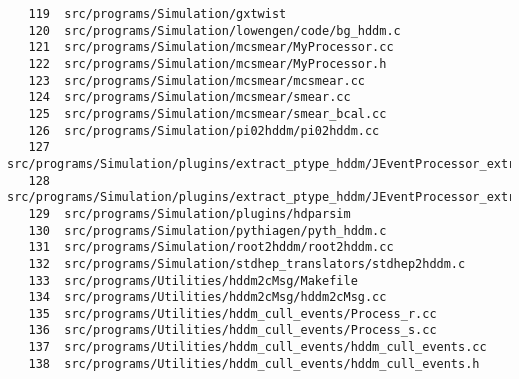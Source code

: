\small
\begin{verbatim}
   119  src/programs/Simulation/gxtwist
   120  src/programs/Simulation/lowengen/code/bg_hddm.c
   121  src/programs/Simulation/mcsmear/MyProcessor.cc
   122  src/programs/Simulation/mcsmear/MyProcessor.h
   123  src/programs/Simulation/mcsmear/mcsmear.cc
   124  src/programs/Simulation/mcsmear/smear.cc
   125  src/programs/Simulation/mcsmear/smear_bcal.cc
   126  src/programs/Simulation/pi02hddm/pi02hddm.cc
   127  src/programs/Simulation/plugins/extract_ptype_hddm/JEventProcessor_extract_ptype_hddm.cc
   128  src/programs/Simulation/plugins/extract_ptype_hddm/JEventProcessor_extract_ptype_hddm.h
   129  src/programs/Simulation/plugins/hdparsim
   130  src/programs/Simulation/pythiagen/pyth_hddm.c
   131  src/programs/Simulation/root2hddm/root2hddm.cc
   132  src/programs/Simulation/stdhep_translators/stdhep2hddm.c
   133  src/programs/Utilities/hddm2cMsg/Makefile
   134  src/programs/Utilities/hddm2cMsg/hddm2cMsg.cc
   135  src/programs/Utilities/hddm_cull_events/Process_r.cc
   136  src/programs/Utilities/hddm_cull_events/Process_s.cc
   137  src/programs/Utilities/hddm_cull_events/hddm_cull_events.cc
   138  src/programs/Utilities/hddm_cull_events/hddm_cull_events.h
\end{verbatim}

